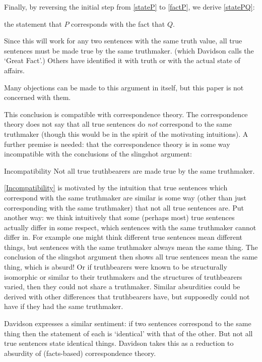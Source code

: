 Finally, by reversing the initial step from \ref{stateP} to \ref{factP}, we derive \ref{statePQ}:

	\begin{example}\label{statePQ}
	the statement that $P$ corresponds with the fact that $Q$.
	\end{example}

Since this will work for any two sentences with the same truth value, all true sentences must be made true by the same truthmaker. (which Davidson calls the `Great Fact'.)
\parencite[753]{Davidson_1969}
Others have identified it with truth \parencite[216]{Frege_1948} or with the actual state of affairs.

Many objections can be made to this argument in itself, but this paper is not concerned with them.

This conclusion is compatible with correspondence theory.
The correspondence theory does not say that all true sentences do \emph{not} correspond to the same truthmaker (though this would be in the spirit of the motivating intuitions).
A further premise is needed: that the correspondence theory is in some way incompatible with the conclusions of the slingshot argument:

	\begin{principle}{Incompatibility}\label{Incompatibility}
	Not all true truthbearers are made true by the same truthmaker.
	\end{principle}

\ref{Incompatibility} is motivated by the intuition that true sentences which correspond with the same truthmaker are similar is some way (other than just corresponding with the same truthmaker) that not all true sentences are.
Put another way: we think intuitively that some (perhaps most) true sentences actually differ in some respect, which sentences with the same truthmaker cannot differ in.
For example one might think different true sentences mean different things, but sentences with the same truthmaker always mean the same thing.
The conclusion of the slingshot argument then shows all true sentences mean the same thing, which is absurd! Or if truthbearers were known to be structurally isomorphic or similar to their truthmakers and the structures of truthbearers varied, then they could not share a truthmaker.
Similar absurdities could be derived with other differences that truthbearers have, but supposedly could not have if they had the same truthmaker.

Davidson expresses a similar sentiment: if two sentences correspond to the same thing then the statement of each is `identical' with that of the other.
But not all true sentences state identical things.
Davidson takes this as a reduction to absurdity of (facts-based) correspondence theory.
\parencite[750]{Davidson_1969}

